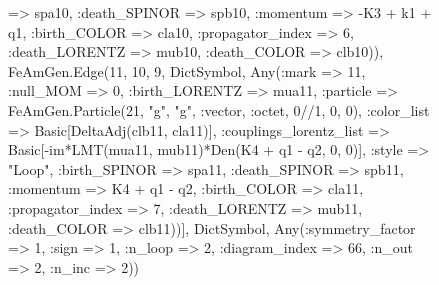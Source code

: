 \documentclass{revtex4}
\begin{document}
\begin{figure}[!htb]
\begin{center}
{=> spa10, :death_SPINOR => spb10, :momentum => -K3 + k1 + q1, :birth_COLOR => cla10, :propagator_index => 6, :death_LORENTZ => mub10, :death_COLOR => clb10)), FeAmGen.Edge(11, 10, 9, Dict{Symbol, Any}(:mark => 11, :null_MOM => 0, :birth_LORENTZ => mua11, :particle => FeAmGen.Particle(21, "g", "g", :vector, :octet, 0//1, 0, 0), :color_list => Basic[DeltaAdj(clb11, cla11)], :couplings_lorentz_list => Basic[-im*LMT(mua11, mub11)*Den(K4 + q1 - q2, 0, 0)], :style => "Loop", :birth_SPINOR => spa11, :death_SPINOR => spb11, :momentum => K4 + q1 - q2, :birth_COLOR => cla11, :propagator_index => 7, :death_LORENTZ => mub11, :death_COLOR => clb11))], Dict{Symbol, Any}(:symmetry_factor => 1, :sign => 1, :n_loop => 2, :diagram_index => 66, :n_out => 2, :n_inc => 2)) 
}
\end{center}
\end{figure}
\end{document}
